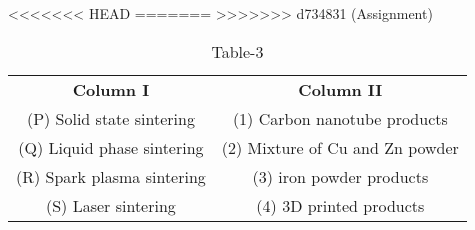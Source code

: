 \begin{table}[htbp]
  \centering
  \caption{Table-3}
<<<<<<< HEAD
  \label{tab:tables/table3.tex}
=======
  \label{table3}
>>>>>>> d734831 (Assignment)
  \begin{tabular}{cc}

\textbf{Column I} & \textbf{Column II}\\
     (P) Solid state sintering & (1) Carbon nanotube products\\
     (Q) Liquid phase sintering & (2) Mixture of Cu and Zn powder\\
     (R) Spark plasma sintering & (3) iron powder products\\
     (S) Laser sintering & (4) 3D printed products

  \end{tabular}
\end{table}